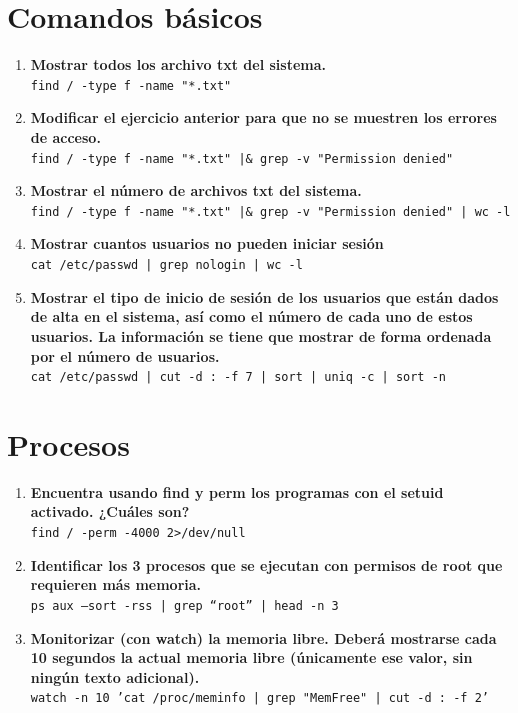 \documentclass[12pt,letterpaper]{article}
\begin{document}
\section{Comandos básicos}
\begin{enumerate}
	\item \textbf{Mostrar todos los archivo txt del sistema.} \\ \texttt{find / -type f -name "*.txt"}
	\item \textbf{Modificar el ejercicio anterior para que no se muestren los errores de acceso.} \\ \texttt{find / -type f -name "*.txt" |\& grep -v "Permission denied"}
	\item \textbf{Mostrar el número de archivos txt del sistema.} \\ \texttt{find / -type f -name "*.txt" |\& grep -v "Permission denied" | wc -l}
	\item \textbf{Mostrar cuantos usuarios no pueden iniciar sesión} \\ \texttt{cat /etc/passwd | grep nologin | wc -l}
	\item \textbf{Mostrar el tipo de inicio de sesión de los usuarios que están dados de alta en el sistema, así como el número de cada uno de estos usuarios. La información se tiene que mostrar de forma ordenada por el número de usuarios.} \\ \texttt{cat /etc/passwd | cut -d : -f 7 | sort | uniq -c | sort -n}
\end{enumerate}

\section{Procesos}
\begin{enumerate}
	\item \textbf{Encuentra usando find y perm los programas con el setuid activado. ¿Cuáles son?} \\ 
	\texttt{find / -perm -4000 2>/dev/null}
	\item \textbf{Identificar los 3 procesos que se ejecutan con permisos de root que requieren más memoria.} \\
	\texttt{ps aux --sort -rss | grep ``root'' | head -n 3}
	\item \textbf{Monitorizar (con watch) la memoria libre. Deberá mostrarse cada 10 segundos la actual memoria libre (únicamente ese valor, sin ningún texto adicional).} \\
	\texttt{watch -n 10 'cat /proc/meminfo | grep "MemFree" | cut -d : -f 2'}
\end{enumerate}
\end{document}
